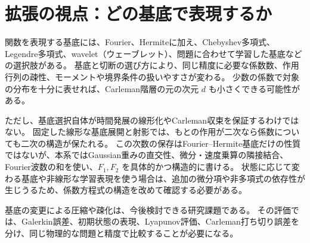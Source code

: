 \section{拡張の視点：どの基底で表現するか}
関数を表現する基底には、Fourier、Hermiteに加え、Chebyshev多項式、Legendre多項式、wavelet（ウェーブレット）、問題に合わせて学習した基底などの選択肢がある。
基底と切断の選び方により、同じ精度に必要な係数数、作用行列の疎性、モーメントや境界条件の扱いやすさが変わる。
少数の係数で対象の分布を十分に表せれば、Carleman階層の元の次元 $d$ も小さくできる可能性がある。

ただし、基底選択自体が時間発展の線形化やCarleman収束を保証するわけではない。
固定した線形な基底展開と射影では、もとの作用が二次なら係数についても二次の構造が保たれる。
この次数の保存はFourier--Hermite基底だけの性質ではないが、本系ではGaussian重みの直交性、微分・速度乗算の隣接結合、Fourier波数の和を使い、$F_1,F_2$ を具体的かつ構造的に書ける。
状態に応じて変わる基底や非線形な学習表現を使う場合は、追加の微分項や非多項式の依存性が生じうるため、係数方程式の構造を改めて確認する必要がある。

基底の変更による圧縮や疎化は、今後検討できる研究課題である。
その評価では、Galerkin誤差、初期状態の表現、Lyapunov評価、Carleman打ち切り誤差を分け、同じ物理的な問題と精度で比較することが必要になる。
